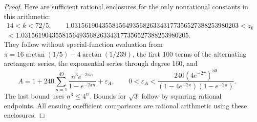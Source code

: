 \begin{proof}
Here are sufficient rational enclosures for the only nonrational
constants in this arithmetic:
\begin{equation}\label{eq:cc-constants}
 \begin{gathered}
 14<k<72/5,\qquad
 1.0315619043558156493568263343177356527388253980203
 <z_0\\
 <1.0315619043558156493568263343177356527388253980205.
 \end{gathered}
\end{equation}
They follow without special-function evaluation from
$\pi=16\arctan(1/5)-4\arctan(1/239)$, the first 100 terms
of the alternating arctangent series, the exponential series
through degree 160, and
\[
 A=1+240\sum_{n=1}^{49}\frac{n^3e^{-2\pi n}}{1-e^{-2\pi n}}
       +\varepsilon_A,\qquad
 0<\varepsilon_A<
 \frac{240(4e^{-2\pi})^{50}}
 {(1-4e^{-2\pi})(1-e^{-2\pi})}.
\]
The last bound uses $n^3\le4^n$. Bounds for $\sqrt3$ follow
by squaring rational endpoints. All ensuing coefficient
comparisons are rational arithmetic using these enclosures.


\end{proof}
